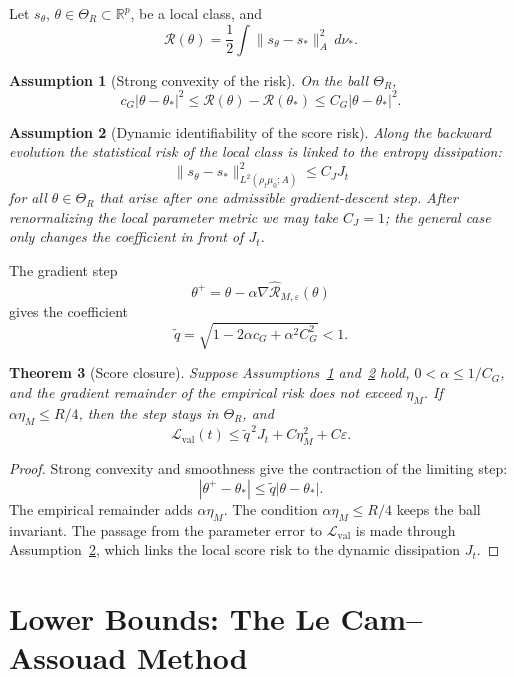 \documentclass{article}
\newtheorem{theorem}{Theorem}[section]
\newtheorem{assumption}[theorem]{Assumption}
\newcommand{\Eval}{\mathcal L_{\mathrm{val}}}
\begin{document}
Let \(s_\theta\), \(\theta\in\Theta_R\subset\mathbb R^p\), be a local class, and
\[
        \mathcal R(\theta)=
        \frac12\int\|s_\theta-s_*\|_A^2\,d\nu_* .
\]

\begin{assumption}[Strong convexity of the risk]
\label{ass:risk}
On the ball \(\Theta_R\),
\[
        c_G|\theta-\theta_*|^2
        \le
        \mathcal R(\theta)-\mathcal R(\theta_*)
        \le
        C_G|\theta-\theta_*|^2 .
\]
\end{assumption}

\begin{assumption}[Dynamic identifiability of the score risk]
\label{ass:J-ident}
Along the backward evolution the statistical risk of the local class is linked to
the entropy dissipation:
\[
        \|s_\theta-s_*\|_{L^2(\rho_t\mu_0;A)}^2
        \le C_J J_t
\]
for all \(\theta\in\Theta_R\) that arise after one admissible gradient-descent
step. After renormalizing the local parameter metric we may take \(C_J=1\); the
general case only changes the coefficient in front of \(J_t\).
\end{assumption}

The gradient step
\[
        \theta^+=\theta-\alpha\nabla\widehat{\mathcal R}_{M,\varepsilon}(\theta)
\]
gives the coefficient
\[
        \widetilde q=
        \sqrt{1-2\alpha c_G+\alpha^2C_G^2}<1.
\]

\begin{theorem}[Score closure]
\label{thm:closure}
Suppose Assumptions~\ref{ass:risk} and~\ref{ass:J-ident} hold, \(0<\alpha\le 1/C_G\), and
the gradient remainder of the empirical risk does not exceed \(\eta_M\). If
\(\alpha\eta_M\le R/4\), then the step stays in \(\Theta_R\), and
\[
        \Eval(t)\le
        \widetilde q^{\,2}J_t+
        C\eta_M^2+C\varepsilon .
\]
\end{theorem}

\begin{proof}
Strong convexity and smoothness give the contraction of the limiting step:
\[
        |\theta^+-\theta_*|\le \widetilde q|\theta-\theta_*|.
\]
The empirical remainder adds \(\alpha\eta_M\). The condition
\(\alpha\eta_M\le R/4\) keeps the ball invariant. The passage from the parameter
error to \(\Eval\) is made through Assumption~\ref{ass:J-ident}, which links the
local score risk to the dynamic dissipation \(J_t\).
\end{proof}

\section{Lower Bounds: The Le Cam--Assouad Method}
\end{document}

